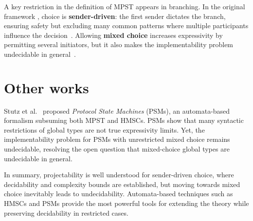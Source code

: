 A key restriction in the definition of MPST appears in branching. 
In the original framework \cite{honda2008multiparty,carbone2012structured}, 
choice is \textbf{sender-driven}: the first sender dictates the branch, 
ensuring safety but excluding many common patterns where multiple 
participants influence the decision~\cite{carbone2012structured}.  
Allowing \textbf{mixed choice} increases expressivity by permitting 
several initiators, but it also makes the implementability problem 
undecidable in general~\cite{stutz2024implementability}.  

\section{Other works}
Stutz et al.~\cite{stutz2025automata} proposed \emph{Protocol State Machines} 
(PSMs), an automata-based formalism subsuming both MPST and HMSCs. 
PSMs show that many syntactic restrictions of global types are not 
true expressivity limits. Yet, the implementability problem for PSMs 
with unrestricted mixed choice remains undecidable, resolving the 
open question that mixed-choice global types are undecidable in general.  

In summary, projectability is well understood for sender-driven choice, 
where decidability and complexity bounds are established, but moving 
towards mixed choice inevitably leads to undecidability. Automata-based 
techniques such as HMSCs and PSMs provide the most powerful tools for 
extending the theory while preserving decidability in restricted cases.